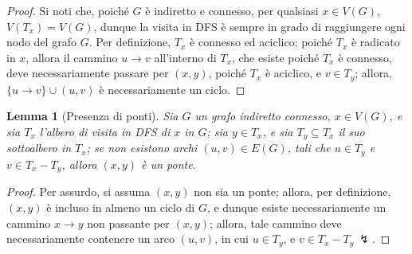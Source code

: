 \documentclass[14pt]{extreport}
\newtheorem{lemma}{Lemma}[subsection]
\theoremstyle{definition}
\theoremstyle{definition}
\begin{document}
\begin{proof}
    Si noti che, poiché $G$ è indiretto e connesso, per qualsiasi $x \in V(G)$, $V(T_x) = V(G)$, dunque la visita in DFS è sempre in grado di raggiungere ogni nodo del grafo $G$.
    Per definizione, $T_x$ è connesso ed aciclico; poiché $T_x$ è radicato in $x$, allora il cammino $u \rightarrow v$ all'interno di $T_x$, che esiste poiché $T_x$ è connesso, deve necessariamente passare per $(x, y)$, poiché $T_x$ è aciclico, e $v \in T_y$; allora, $\{u \rightarrow v\} \cup (u, v)$ è necessariamente un ciclo.
\end{proof}

\begin{lemma}[Presenza di ponti]
    Sia $G$ un grafo indiretto connesso, $x \in V(G)$, e sia $T_x$ l'albero di visita in DFS di $x$ in $G$; sia $y \in T_x$, e sia $T_y \subseteq T_x$ il suo sottoalbero in $T_x$; se non esistono archi $(u, v) \in E(G)$, tali che $u \in T_y$ e $v \in T_x - T_y$, allora $(x, y)$ è un ponte.
\end{lemma}

\begin{proof}
    Per assurdo, si assuma $(x, y)$ non sia un ponte; allora, per definizione, $(x, y)$ è incluso in almeno un ciclo di $G$, e dunque esiste necessariamente un cammino $x \rightarrow y$ non passante per $(x, y)$; allora, tale cammino deve necessariamente contenere un arco $(u, v)$, in cui $u \in T_y$, e $v \in T_x - T_y \ \lightning$.
\end{proof}
\end{document}
